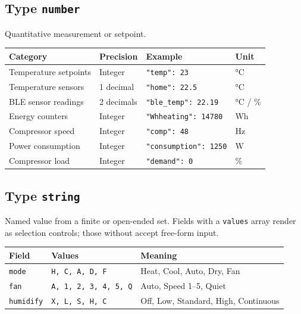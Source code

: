 \documentclass[11pt,a4paper]{article}
\newcommand{\field}[1]{\texttt{\color{codegreen}#1}}
\begin{document}
\subsection{Type \texttt{number}}

Quantitative measurement or setpoint.

\begin{tabular}{@{}llll@{}}
\toprule
\textbf{Category} & \textbf{Precision} & \textbf{Example} & \textbf{Unit} \\
\midrule
\rowcolor{lightbg}
Temperature setpoints  & Integer       & \texttt{"temp": 23}           & °C \\
Temperature sensors    & 1 decimal     & \texttt{"home": 22.5}         & °C \\
\rowcolor{lightbg}
BLE sensor readings    & 2 decimals    & \texttt{"ble\_temp": 22.19}   & °C / \% \\
Energy counters        & Integer       & \texttt{"Whheating": 14780}   & Wh \\
\rowcolor{lightbg}
Compressor speed       & Integer       & \texttt{"comp": 48}           & Hz \\
Power consumption      & Integer       & \texttt{"consumption": 1250}  & W \\
\rowcolor{lightbg}
Compressor load        & Integer       & \texttt{"demand": 0}          & \% \\
\bottomrule
\end{tabular}

\subsection{Type \texttt{string}}

Named value from a finite or open-ended set. Fields with a \texttt{values} array render as selection controls; those without accept free-form input.

\begin{tabular}{@{}lll@{}}
\toprule
\textbf{Field} & \textbf{Values} & \textbf{Meaning} \\
\midrule
\rowcolor{lightbg}
\field{mode}     & \texttt{H, C, A, D, F} & Heat, Cool, Auto, Dry, Fan \\
\field{fan}      & \texttt{A, 1, 2, 3, 4, 5, Q} & Auto, Speed 1–5, Quiet \\
\rowcolor{lightbg}
\field{humidify} & \texttt{X, L, S, H, C} & Off, Low, Standard, High, Continuous \\
\bottomrule
\end{tabular}
\end{document}
